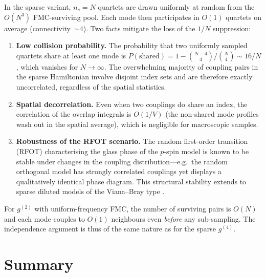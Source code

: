 \documentclass[11pt,a4paper]{article}
\begin{document}
In the sparse variant, $n_s=N$ quartets are drawn uniformly at
random from the $O(N^3)$ FMC-surviving pool.  Each mode then
participates in $O(1)$ quartets on average (connectivity~$\sim 4$).
Two facts mitigate the loss of the $1/N$ suppression:

\begin{enumerate}[nosep,label=(\roman*)]
\item \textbf{Low collision probability.}
  The probability that two uniformly sampled quartets share at
  least one mode is
  $P(\text{shared}) = 1 - \binom{N-4}{4}\big/\binom{N}{4}
   \sim 16/N$,
  which vanishes for $N\to\infty$.  The overwhelming majority of
  coupling pairs in the sparse Hamiltonian involve disjoint
  index sets and are therefore exactly uncorrelated, regardless
  of the spatial statistics.

\item \textbf{Spatial decorrelation.}
  Even when two couplings do share an index, the correlation
  of the overlap integrals is $O(1/V)$ (the non-shared mode
  profiles wash out in the spatial average), which is negligible
  for macroscopic samples.

\item \textbf{Robustness of the RFOT scenario.}
  The random first-order transition (RFOT) characterising the
  glass phase of the $p$-spin model
  \cite{Kirkpatrick1989,Gradenigo2020} is known to be stable
  under changes in the coupling distribution---e.g.\ the random
  orthogonal model \cite{Marinari1994,Parisi1995} has strongly
  correlated couplings yet displays a qualitatively identical
  phase diagram.  This structural stability extends to sparse
  diluted models of the Viana--Bray type
  \cite{Viana1985,MPV1987}.
\end{enumerate}

For $g^{(2)}$ with uniform-frequency FMC, the number of surviving
pairs is $O(N)$ and each mode couples to $O(1)$ neighbours even
\emph{before} any sub-sampling.  The independence argument is thus
of the same nature as for the sparse $g^{(4)}$.

\section{Summary}
\end{document}
